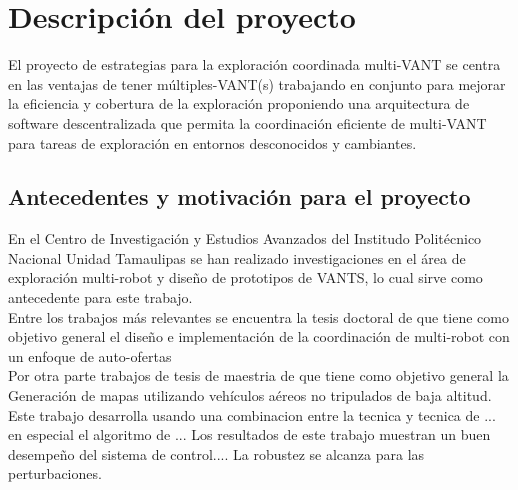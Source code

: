 \documentclass[11pt,epsf,times]{article}
\begin{document}
\newpage
\section*{Descripci\'{o}n del proyecto}

El proyecto de estrategias para la exploraci\'{o}n coordinada multi-VANT se centra en las ventajas de tener m\'{u}ltiples-VANT(s) trabajando en conjunto para mejorar la eficiencia y cobertura de la exploraci\'{o}n proponiendo una arquitectura de software descentralizada que permita la coordinaci\'{o}n eficiente de multi-VANT para tareas de exploraci\'{o}n en entornos desconocidos y cambiantes.


\subsection*{Antecedentes y motivaci\'{o}n para el proyecto}


En el Centro de Investigaci\'{o}n y Estudios Avanzados del Institudo Politécnico Nacional Unidad Tamaulipas se han realizado investigaciones en el área de exploraci\'{o}n multi-robot y dise\~{n}o de prototipos de VANTS, lo cual sirve como antecedente para este trabajo.\\

Entre los trabajos más relevantes se encuentra la tesis doctoral de \cite{CINVESTAM2013} que tiene como objetivo general el dise\~{n}o e implementaci\'{o}n de la coordinaci\'{o}n de multi-robot con un enfoque de auto-ofertas\\

Por otra parte trabajos de tesis de maestria de \cite{CINVES2013} que tiene como objetivo general la Generaci\'{o}n de mapas utilizando veh\'{i}culos a\'{e}reos no tripulados de baja altitud.\\

Este trabajo desarrolla usando una combinacion entre la tecnica y tecnica de ... en especial el algoritmo de ... Los resultados de este trabajo muestran un buen desempe\~{n}o del sistema de control....
La robustez se alcanza para las perturbaciones.\\
\end{document}
